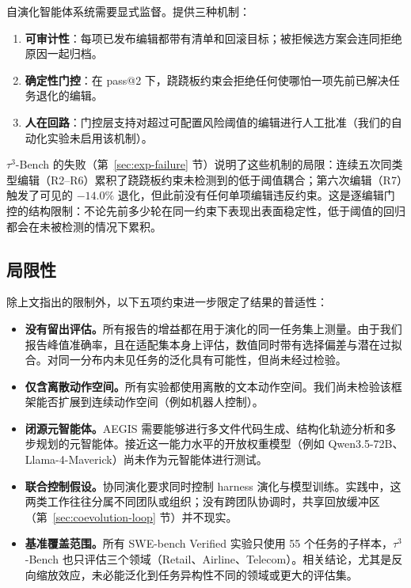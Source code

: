 自演化智能体系统需要显式监督。\ProjectName 提供三种机制：
\begin{enumerate}
  \item \textbf{可审计性}：每项已发布编辑都带有清单和回滚目标；被拒候选方案会连同拒绝原因一起归档。
  \item \textbf{确定性门控}：在 pass@2 下，跷跷板约束会拒绝任何使哪怕一项先前已解决任务退化的编辑。
  \item \textbf{人在回路}：门控层支持对超过可配置风险阈值的编辑进行人工批准（我们的自动化实验未启用该机制）。
\end{enumerate}
$\tau^3$-Bench 的失败（第~\ref{sec:exp-failure} 节）说明了这些机制的局限：连续五次同类型编辑（R2--R6）累积了跷跷板约束未检测到的低于阈值耦合；第六次编辑（R7）触发了可见的 $-14.0\%$ 退化，但此前没有任何单项编辑违反约束。这是逐编辑门控的结构限制：不论先前多少轮在同一约束下表现出表面稳定性，低于阈值的回归都会在未被检测的情况下累积。

\subsection{局限性}

除上文指出的限制外，以下五项约束进一步限定了结果的普适性：
\begin{itemize}
  \item \textbf{没有留出评估。}所有报告的增益都在用于演化的同一任务集上测量。由于我们报告峰值准确率，且在适配集本身上评估，数值同时带有选择偏差与潜在过拟合。对同一分布内未见任务的泛化具有可能性，但尚未经过检验。
  \item \textbf{仅含离散动作空间。}所有实验都使用离散的文本动作空间。我们尚未检验该框架能否扩展到连续动作空间（例如机器人控制）。
  \item \textbf{闭源元智能体。}AEGIS 需要能够进行多文件代码生成、结构化轨迹分析和多步规划的元智能体。接近这一能力水平的开放权重模型（例如 Qwen3.5-72B、Llama-4-Maverick）尚未作为元智能体进行测试。
  \item \textbf{联合控制假设。}协同演化要求同时控制 harness 演化与模型训练。实践中，这两类工作往往分属不同团队或组织；没有跨团队协调时，共享回放缓冲区（第~\ref{sec:coevolution-loop} 节）并不现实。
  \item \textbf{基准覆盖范围。}所有 SWE-bench Verified 实验只使用 55 个任务的子样本，$\tau^3$-Bench 也只评估三个领域（Retail、Airline、Telecom）。相关结论，尤其是反向缩放效应，未必能泛化到任务异构性不同的领域或更大的评估集。
\end{itemize}
